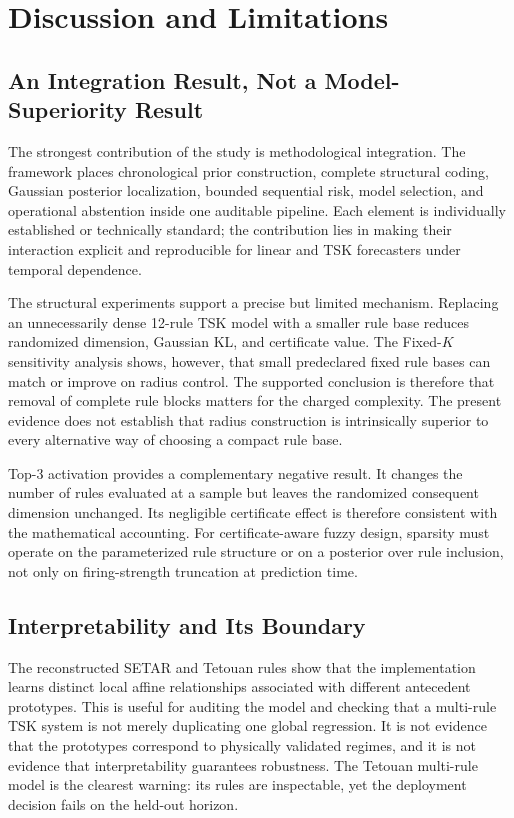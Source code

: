 \section{Discussion and Limitations}
\label{sec:discussion}

\subsection{An Integration Result, Not a Model-Superiority Result}
The strongest contribution of the study is methodological integration. The framework places chronological prior construction, complete structural coding, Gaussian posterior localization, bounded sequential risk, model selection, and operational abstention inside one auditable pipeline. Each element is individually established or technically standard; the contribution lies in making their interaction explicit and reproducible for linear and TSK forecasters under temporal dependence.

The structural experiments support a precise but limited mechanism. Replacing an unnecessarily dense 12-rule TSK model with a smaller rule base reduces randomized dimension, Gaussian KL, and certificate value. The Fixed-$K$ sensitivity analysis shows, however, that small predeclared fixed rule bases can match or improve on radius control. The supported conclusion is therefore that removal of complete rule blocks matters for the charged complexity. The present evidence does not establish that radius construction is intrinsically superior to every alternative way of choosing a compact rule base.

Top-3 activation provides a complementary negative result. It changes the number of rules evaluated at a sample but leaves the randomized consequent dimension unchanged. Its negligible certificate effect is therefore consistent with the mathematical accounting. For certificate-aware fuzzy design, sparsity must operate on the parameterized rule structure or on a posterior over rule inclusion, not only on firing-strength truncation at prediction time.

\subsection{Interpretability and Its Boundary}
The reconstructed SETAR and Tetouan rules show that the implementation learns distinct local affine relationships associated with different antecedent prototypes. This is useful for auditing the model and checking that a multi-rule TSK system is not merely duplicating one global regression. It is not evidence that the prototypes correspond to physically validated regimes, and it is not evidence that interpretability guarantees robustness. The Tetouan multi-rule model is the clearest warning: its rules are inspectable, yet the deployment decision fails on the held-out horizon.

